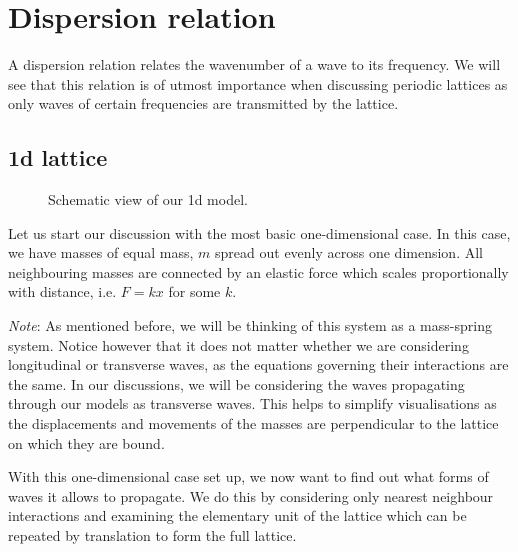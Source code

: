 \chapter{Dispersion relation}
\label{disperrel}
A dispersion relation relates the wavenumber of a wave to its frequency. We
will see that this relation is of utmost importance when discussing periodic
lattices as only waves of certain frequencies are transmitted by the lattice.

\section{1d lattice}
\begin{figure}[!h]
\begin{center}
  \caption{\label{fig:sqscheme1d} Schematic view of our 1d model.}
\end{center}
\end{figure}

Let us start our discussion with the most basic one-dimensional case. In this
case, we have masses of equal mass, $m$ spread out evenly across one dimension.
All neighbouring masses are connected by an elastic force which scales
proportionally with distance, i.e. $F = kx$ for some $k$.

\textit{Note}: As mentioned before, we will be thinking of this system as a
mass-spring system. Notice however that it does not matter whether we are
considering longitudinal or transverse waves, as the equations governing their
interactions are the same. In our discussions, we will be considering the waves
propagating through our models as transverse waves. This helps to simplify
visualisations as the displacements and movements of the masses are
perpendicular to the lattice on which they are bound.

With this one-dimensional case set up, we now want to find out what forms of
waves it allows to propagate. We do this by considering only nearest neighbour
interactions and examining the elementary unit of the lattice which can be
repeated by translation to form the full lattice.

